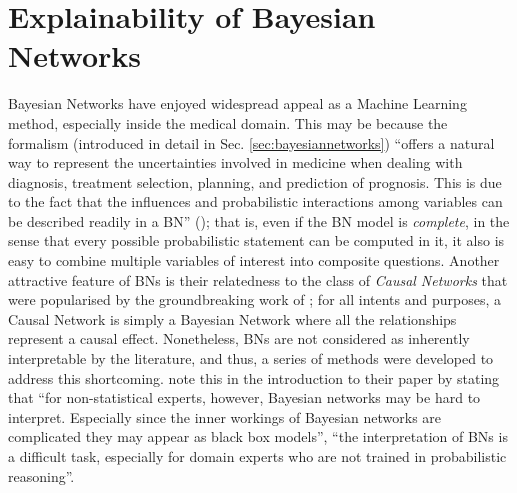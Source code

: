 \section{Explainability of Bayesian Networks} \label{sec:explainability-in-bayesian-networks}
Bayesian Networks have enjoyed widespread appeal as a Machine Learning method, especially inside the medical domain.
This may be because the formalism (introduced in detail in Sec. \ref{sec:bayesiannetworks}) \enquote{offers a natural way to represent the uncertainties involved in medicine when dealing
with diagnosis, treatment selection, planning, and prediction of prognosis. This is due to the fact that the influences and probabilistic interactions among variables can be described readily in a BN} (\cite{Lucas2001}); that is, even if the BN model is \textit{complete}, in the sense that every possible probabilistic statement can be computed in it, it also is easy to combine multiple variables of interest into composite questions.
Another attractive feature of BNs is their relatedness to the class of \textit{Causal Networks} that were popularised by the groundbreaking work of \cite{Pearl1988}; for all intents and purposes, a Causal Network is simply a Bayesian Network where all the relationships represent a causal effect.
Nonetheless, BNs are not considered as inherently interpretable by the literature, and thus, a series of methods were developed to address this shortcoming.
\cite{timmer2015explaining} note this in the introduction to their paper by stating that \enquote{for non-statistical experts, however, Bayesian networks may be hard to interpret. Especially since the inner workings of Bayesian networks are complicated they may appear as black box models}, \enquote{the interpretation of BNs is a difficult task, especially for domain experts who are not trained in probabilistic reasoning}.

